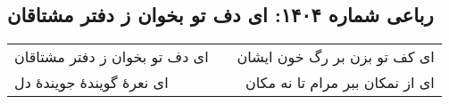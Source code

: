 \begin{center}
\section*{رباعی شماره ۱۴۰۴: ای دف تو بخوان ز دفتر مشتاقان}
\label{sec:1404}
\begin{longtable}{l p{0.5cm} r}
ای دف تو بخوان ز دفتر مشتاقان
&&
ای کف تو بزن بر رگ خون ایشان
\\
ای نعرهٔ گویندهٔ جویندهٔ دل
&&
ای از نمکان ببر مرام تا نه مکان
\\
\end{longtable}
\end{center}
